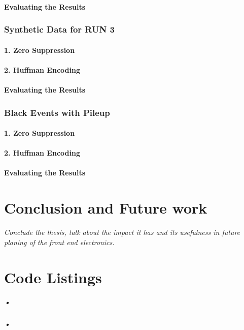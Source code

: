 \documentclass[a4paper, 12pt]{report}
\begin{document}
\subsubsection{Evaluating the Results}

\subsection{Synthetic Data for RUN 3}
\subsubsection{1. Zero Suppression}
\subsubsection{2. Huffman Encoding}
\subsubsection{Evaluating the Results}

\subsection{Black Events with Pileup}
\subsubsection{1. Zero Suppression}
\subsubsection{2. Huffman Encoding}
\subsubsection{Evaluating the Results}


\chapter{Conclusion and Future work}
\textit{Conclude the thesis, talk about the impact it has and its usefulness in future planing of the front end electronics.}

\appendix
\chapter{Code Listings}
\label{cha:app-code}

\paragraph{•}
\begin{minipage}{\linewidth}

\end{minipage}

\paragraph{•}
\begin{minipage}{\linewidth}

\end{minipage}

{}

\end{document}
